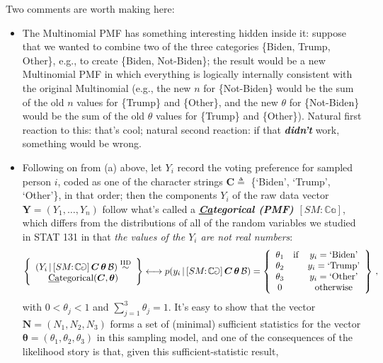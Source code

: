\documentclass[12pt]{article}
\newcommand{\given}{\, | \,}
\newcommand{\bi}[1]{\b{\i{#1}}}
\renewcommand{\b}[1]{\textbf{#1}}
\renewcommand{\i}[1]{\textit{#1}}
\renewcommand{\u}[1]{\underline{#1}}
\begin{document}
Two comments are worth making here:

\begin{itemize}

\item

The Multinomial PMF has something interesting hidden inside it: suppose that we wanted to combine two of the three categories \{Biden, Trump, Other\}, e.g., to create \{Biden, Not-Biden\}; the result would be a new Multinomial PMF in which everything is logically internally consistent with the original Multinomial (e.g., the new $n$ for \{Not-Biden\} would be the sum of the old $n$ values for \{Trump\} and \{Other\}, and the new $\theta$ for \{Not-Biden\} would be the sum of the old $\theta$ values for \{Trump\} and \{Other\}). Natural first reaction to this: that's cool; natural second reaction: if that \bi{didn't} work, something would be wrong.

\item

Following on from (a) above, let $Y_i$ record the voting preference for sampled person $i$, coded as one of the character strings $\bm{ C } \triangleq $ \{`Biden', `Trump', `Other'\}, in that order; then the components $Y_i$ of the raw data vector $\bm{ Y } = ( Y_1, \dots, Y_n )$ follow what's called a \bi{\u{Ca}tegorical (PMF) $[ SM  \! \! : \! \mathbb{ Ca }]$}, which differs from the distributions of all of the random variables we studied in STAT 131 in that \textit{the values of the $Y_i$ are not real numbers}:
\begin{equation} \label{e:categorical-1}
\left\{ \begin{array}{c} ( Y_i \given [ SM \! \! : \! \mathbb{ Ca } ] \, \bm{ C } \, \bm{ \theta } \, \mathcal{ B } ) \stackrel{ \textrm{IID} }{ \sim } \\ \textrm{\u{Ca}tegorical} ( \bm{ C }, \bm{ \theta } ) \end{array} \right\} \longleftrightarrow p ( y_i \given [ SM \! \! : \! \mathbb{ Ca } ] \, \bm{ C } \, \bm{ \theta } \, \mathcal{ B } ) = \left\{ \begin{array}{ccc} \theta_1 & \textrm{if} & y_i = \textrm{`Biden'} \\ \theta_2 & & y_i = \textrm{`Trump'} \\ \theta_3 & & y_i = \textrm{`Other'} \\ 0 & & \textrm{otherwise} \end{array} \right\} \, ,
\end{equation}
with $0 < \theta_j < 1$ and $\sum_{ j = 1 }^3 \theta_j = 1$. It's easy to show that the vector $\bm{ N } = ( N_1, N_2, N_3 )$ forms a set of (minimal) sufficient statistics for the vector $\bm{ \theta } = ( \theta_1, \theta_2, \theta_3 )$ in this sampling model, and one of the consequences of the likelihood story is that, given this sufficient-statistic result, 


\end{itemize}
\end{document}
